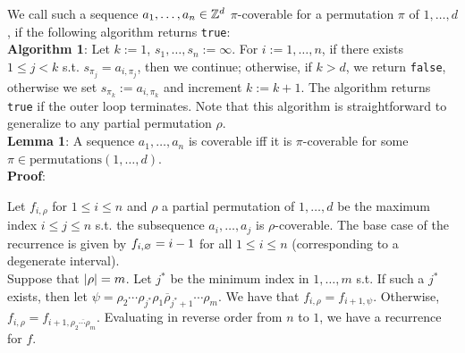 \documentclass{article}
\begin{document}
\maketitle
  
  We call such a sequence $a_1,\dots,a_n\in\mathbb{Z}^d$ $\pi$-coverable for a permutation $\pi$ of $1,\dots,d$, if the following algorithm returns \texttt{true}: \\

  \textbf{Algorithm 1}: Let $k:=1$, $s_1,\dots,s_n:=\infty$. For $i:=1,\dots,n$, if there exists $1\leq j<k$ s.t. $s_{\pi_j}=a_{i,\pi_j}$, then we continue; otherwise, if $k>d$, we return \texttt{false}, otherwise we set $s_{\pi_k}:=a_{i,\pi_k}$ and increment $k:=k+1$. The algorithm returns \texttt{true} if the outer loop terminates. Note that this algorithm is straightforward to generalize to any partial permutation $\rho$. \\

  \textbf{Lemma 1}: A sequence $a_1,\dots,a_n$ is coverable iff it is $\pi$-coverable for some $\pi\in \text{permutations}(1,\dots,d)$.\\
  \textbf{Proof}:

  Let $f_{i,\rho}$ for $1\leq i\leq n$ and $\rho$ a partial permutation of $1,\dots,d$ be the maximum index $i\leq j\leq n$ s.t. the subsequence $a_i,\dots,a_j$ is $\rho$-coverable. The base case of the recurrence is given by $f_{i,\varnothing}=i-1$ for all $1\leq i\leq n$ (corresponding to a degenerate interval). \\

  Suppose that $\left\lvert \rho \right\rvert=m$. Let $j^*$ be the minimum index in $1,\dots,m$ s.t. 
  If such a $j^*$ exists, then let $\psi=\overline{\rho_2\cdots\rho_{j^*}\rho_1\rho_{j^*+1}\cdots\rho_m}$. We have that $f_{i,\rho}=f_{i+1,\psi}$. Otherwise, $f_{i,\rho}=f_{i+1,\overline{\rho_2\cdots\rho_m}}$. Evaluating in reverse order from $n$ to $1$, we have a recurrence for $f$. \\
\end{document}
